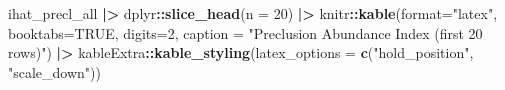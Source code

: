 \documentclass[
]{article}
\newenvironment{Shaded}{\begin{snugshade}}{\end{snugshade}}
\newcommand{\AttributeTok}[1]{\textcolor[rgb]{0.13,0.29,0.53}{#1}}
\newcommand{\ConstantTok}[1]{\textcolor[rgb]{0.56,0.35,0.01}{#1}}
\newcommand{\DecValTok}[1]{\textcolor[rgb]{0.00,0.00,0.81}{#1}}
\newcommand{\FunctionTok}[1]{\textcolor[rgb]{0.13,0.29,0.53}{\textbf{#1}}}
\newcommand{\NormalTok}[1]{#1}
\newcommand{\SpecialCharTok}[1]{\textcolor[rgb]{0.81,0.36,0.00}{\textbf{#1}}}
\newcommand{\StringTok}[1]{\textcolor[rgb]{0.31,0.60,0.02}{#1}}
\begin{document}
\begin{Shaded}
\begin{Highlighting}[]
\NormalTok{ihat\_precl\_all }\SpecialCharTok{|\textgreater{}} 
\NormalTok{  dplyr}\SpecialCharTok{::}\FunctionTok{slice\_head}\NormalTok{(}\AttributeTok{n =} \DecValTok{20}\NormalTok{) }\SpecialCharTok{|\textgreater{}}
\NormalTok{  knitr}\SpecialCharTok{::}\FunctionTok{kable}\NormalTok{(}\AttributeTok{format=}\StringTok{"latex"}\NormalTok{, }\AttributeTok{booktabs=}\ConstantTok{TRUE}\NormalTok{, }\AttributeTok{digits=}\DecValTok{2}\NormalTok{,}
              \AttributeTok{caption =} \StringTok{"Preclusion Abundance Index (first 20 rows)"}\NormalTok{) }\SpecialCharTok{|\textgreater{}}
\NormalTok{  kableExtra}\SpecialCharTok{::}\FunctionTok{kable\_styling}\NormalTok{(}\AttributeTok{latex\_options =} \FunctionTok{c}\NormalTok{(}\StringTok{"hold\_position"}\NormalTok{, }\StringTok{"scale\_down"}\NormalTok{))}
\end{Highlighting}
\end{Shaded}
\end{document}

